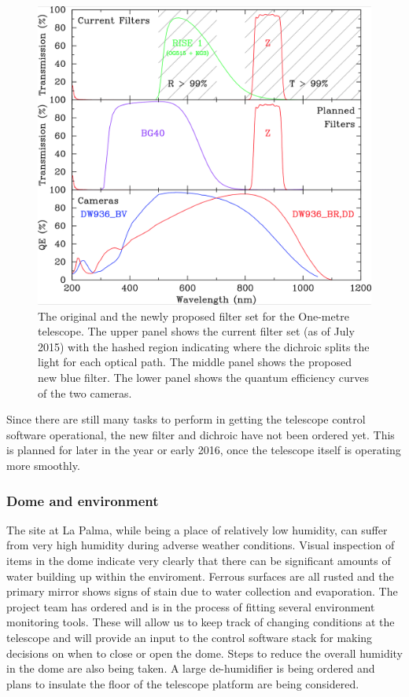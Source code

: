 \documentclass[a4paper,fleqn,usenatbib]{mnras}
\begin{document}
\begin{figure}
	\includegraphics[width=\columnwidth]{images/filters.png}
    \caption{The original and the newly proposed filter set for the One-metre telescope. The upper panel shows the current filter set (as of July 2015) with the hashed region indicating where the dichroic splits the light for each optical path. The middle panel shows the proposed new blue filter. The lower panel shows the quantum efficiency curves of the two cameras. }
    \label{fig:filters}
\end{figure}

Since there are still many tasks to perform in getting the telescope control software operational, the new filter and dichroic have not been ordered yet. This is planned for later in the year or early 2016, once the telescope itself is operating more smoothly.

\subsubsection{Dome and environment}
The site at La Palma, while being a place of relatively low humidity, can suffer from very high humidity during adverse weather conditions. Visual inspection of items in the dome indicate very clearly that there can be significant amounts of water building up within the enviroment. Ferrous surfaces are all rusted and the primary mirror shows signs of stain due to water collection and evaporation. The project team has ordered and is in the process of fitting several environment monitoring tools. These will allow us to keep track of changing conditions at the telescope and will provide an input to the control software stack for making decisions on when to close or open the dome. Steps to reduce the overall humidity in the dome are also being taken. A large de-humidifier is being ordered and plans to insulate the floor of the telescope platform are being considered.  
\end{document}
